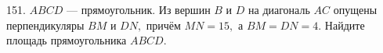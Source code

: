 151. $ABCD$ --- прямоугольник. Из вершин $B$ и $D$ на диагональ $AC$ опущены перпендикуляры $BM$ и $DN,$
причём $MN=15,$ а $BM=DN=4.$ Найдите площадь прямоугольника $ABCD.$\\

